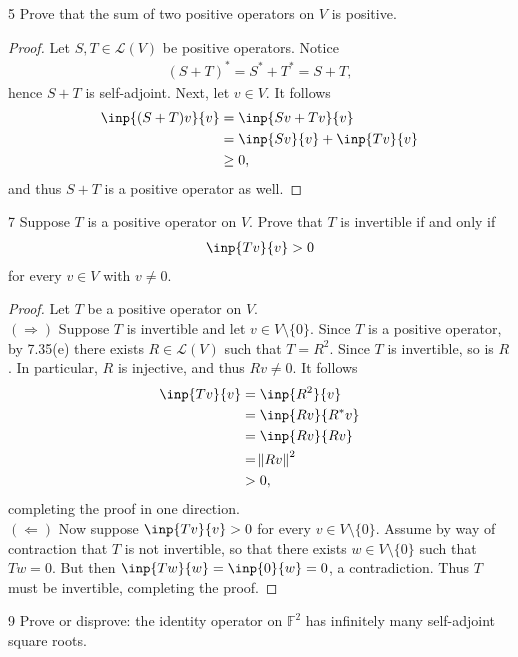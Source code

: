\documentclass{extarticle}
\newenvironment{problem}[1]{\begin{prob*}{#1}{}}{\end{prob*}}
\newcommand{\F}{\mathbb{F}}
\newcommand{\Hom}{\mathcal{L}}
\begin{document}
\begin{problem}{5}
Prove that the sum of two positive operators on $V$ is positive.
\end{problem}
\begin{proof}
Let $S,T\in\Hom(V)$ be positive operators.  Notice
\begin{align*}
(S + T)^\ast = S^\ast + T^\ast = S + T,
\end{align*}
hence $S + T$ is self-adjoint.  Next, let $v\in V$.  It follows
\begin{align*}
\inp{(S + T)v}{v} &= \inp{Sv + Tv}{v}\\
&= \inp{Sv}{v} + \inp{Tv}{v}\\
&\geq 0,
\end{align*}
and thus $S + T$ is a positive operator as well. 
\end{proof}

\begin{problem}{7}
Suppose $T$ is a positive operator on $V$.  Prove that $T$ is invertible if and only if
\begin{align*}
\inp{Tv}{v} > 0
\end{align*}
for every $v\in V$ with $v\neq 0$.
\end{problem}
\begin{proof}
Let $T$ be a positive operator on $V$.\\
\indent $(\Rightarrow)$ Suppose $T$ is invertible and let $v\in V\setminus\{0\}$.  Since $T$ is a positive operator, by 7.35(e) there exists $R\in\Hom(V)$ such that $T = R^2$.  Since $T$ is invertible, so is $R$.  In particular, $R$ is injective, and thus $Rv\neq 0$.  It follows
\begin{align*}
\inp{Tv}{v} &= \inp{R^2}{v}\\
&= \inp{Rv}{R^\ast v}\\
&= \inp{Rv}{Rv}\\
&= \norm{Rv}^2\\
&> 0,
\end{align*} 
completing the proof in one direction.\\
\indent $(\Leftarrow)$ Now suppose $\inp{Tv}{v} > 0$ for every $v\in V\setminus\{0\}$.  Assume by way of contraction that $T$ is not invertible, so that there exists $w\in V\setminus\{0\}$ such that $Tw = 0$.  But then $\inp{Tw}{w} = \inp{0}{w} = 0$, a contradiction.  Thus $T$ must be invertible, completing the proof.
\end{proof}

\begin{problem}{9}
Prove or disprove: the identity operator on $\F^2$ has infinitely many self-adjoint square roots.
\end{problem}
\end{document}
